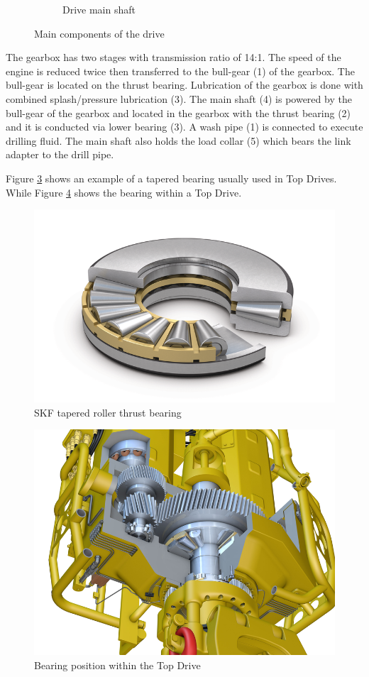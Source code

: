 \begin{figure}[H]
\begin{subfigure}[t]{0.4\textwidth}
	 \label{fig:topdrive-drillingunit-drive-mainshaft}
	 \caption{Drive main shaft}
     \end{subfigure}
	\caption{Main components of the drive}%
	\label{fig:topdrive-drillingunit-drive-components}
\end{figure}

The gearbox has two stages with transmission ratio of 14:1. The speed of the engine is reduced twice then transferred to the bull-gear (1) of the gearbox. The bull-gear is located on the thrust bearing. Lubrication of the gearbox is done with combined splash/pressure lubrication (3). The main shaft (4) is powered by the bull-gear of the gearbox and located in the gearbox with the thrust bearing (2) and it is conducted via lower bearing (3). A wash pipe (1) is connected to execute drilling fluid. The main shaft also holds the load collar (5) which bears the link adapter to the drill pipe. 

Figure \ref{fig:skf_tapered_roller_thrust_bearing} shows an example of a tapered bearing usually used in Top Drives. While Figure \ref{fig:skf_topdrive} shows the bearing within a Top Drive.

\begin{figure}[H]
	\centering
	\includegraphics[width=0.6\linewidth]{figures/skf_tapered_roller_thrust_bearing.png}
	\caption{SKF tapered roller thrust bearing \cite{skf_tapered_roller_thurst_bearing}}%
	\label{fig:skf_tapered_roller_thrust_bearing}
\end{figure}

\begin{figure}[H]
	\centering
	\includegraphics[width=0.7\linewidth]{figures/skf_topdrive.png}
	\caption{Bearing position within the Top Drive \cite{skf_bearing}}%
	\label{fig:skf_topdrive}
\end{figure}

